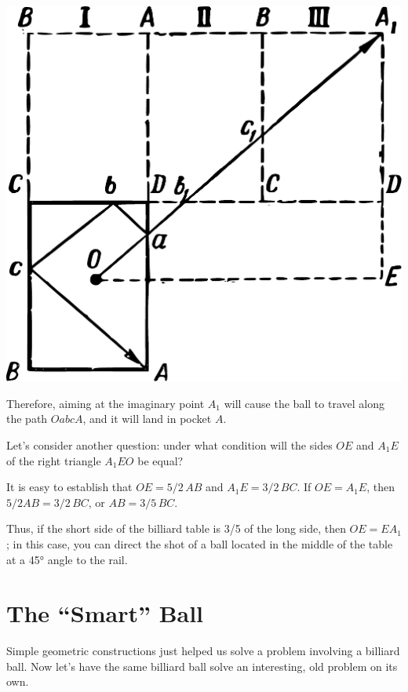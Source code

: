 \begin{marginfigure}%
\centering
\includegraphics[width=\textwidth]{figures/ch-10/fig-151.pdf}
\end{marginfigure}


Therefore, aiming at the imaginary point $A_{1}$ will cause the ball to travel along the path \( OabcA \), and it will land in pocket $A$.

Let’s consider another question: under what condition will the sides \( OE \) and \( A_{1}E \) of the right triangle \( A_{1}EO \) be equal?

It is easy to establish that \( OE = 5/2 \, AB \) and \( A_{1}E = 3/2\, BC \). If \( OE = A_{1}E \), then \( 5/2 AB = 3/2\, BC \), or \( AB = 3/5 \, BC \).

Thus, if the short side of the billiard table is 3/5 of the long side, then \( OE = EA_{1} \); in this case, you can direct the shot of a ball located in the middle of the table at a \ang{45} angle to the rail.

\section{The ``Smart'' Ball}

Simple geometric constructions just helped us solve a problem involving a billiard ball. Now let's have the same billiard ball solve an interesting, old problem on its own.

